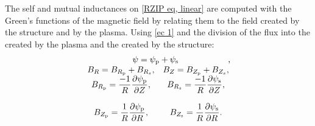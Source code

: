 \documentclass[a4paper,12pt,oneside]{book}
\newcommand{\p}{\partial}
\begin{document}
The self and mutual inductances on \eqref{RZIP eq, linear} are computed with the Green's functions of the magnetic field by relating them to the field created by the structure and by the plasma. Using \eqref{ec 1} and the division of the flux into the created by the plasma and the created by the structure:
%
\begin{equation}
	\left.
	\begin{array}{cc}
	\multicolumn{2}{c}{\psi=\psi_\text{p}+ \psi_\text{s}}, \\
	
B_R=B_{R_\text{p}}+ B_{R_s}, & B_Z=B_{Z_\text{p}}+ B_{Z_s}, \\

	B_{R_\text{p}}= \dfrac{-1}{R} \dfrac{\p \psi_\text{p}}{\p Z}, & 	B_{R_s}= \dfrac{-1}{R} \dfrac{\p \psi_\text{s}}{\p Z}, \\ \\	
	
	B_{Z_\text{p}}= \dfrac{1}{R} \dfrac{\p \psi_\text{p}}{\p R}, & 	B_{Z_\text{s}}= \dfrac{1}{R} \dfrac{\p \psi_\text{s}}{\p R}. \\
	\end{array}
	\right.
\end{equation}
\end{document}
